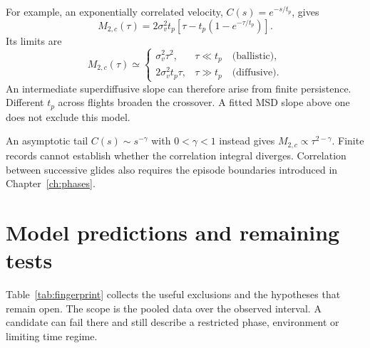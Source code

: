 For example, an exponentially correlated velocity, $C(s)=e^{-s/t_p}$, gives
\begin{equation}
  M_{2,c}(\tau)=2\sigma_v^2t_p
      \left[\tau-t_p(1-e^{-\tau/t_p})\right].
  \label{eq:persistent-msd}
\end{equation}
Its limits are
\[
 M_{2,c}(\tau)\simeq
 \begin{cases}
  \sigma_v^2\tau^2, & \tau\ll t_p \quad\text{(ballistic)},\\
  2\sigma_v^2t_p\tau, & \tau\gg t_p \quad\text{(diffusive)}.
 \end{cases}
\]
An intermediate superdiffusive slope can therefore arise from finite persistence.
Different $t_p$ across flights broaden the crossover. A fitted MSD slope above
one does not exclude this model.

An asymptotic tail $C(s)\sim s^{-\gamma}$ with $0<\gamma<1$ instead gives
$M_{2,c}\propto\tau^{2-\gamma}$. Finite records cannot establish whether the
correlation integral diverges. Correlation between successive glides also requires
the episode boundaries introduced in Chapter~\ref{ch:phases}.

\section{Model predictions and remaining tests}

Table~\ref{tab:fingerprint} collects the useful exclusions and the hypotheses that remain
open. The scope is the pooled data over the observed interval. A candidate can fail there and
still describe a restricted phase, environment or limiting time regime.

